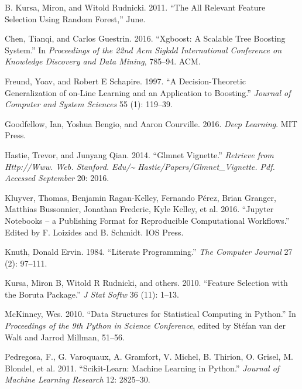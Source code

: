 \documentclass[
  11pt,
  a4paper,
  DIV=12,captions=tableheading,oneside]{scrbook}
\begin{document}
\leavevmode\hypertarget{ref-kursa2011boruta}{}%
B. Kursa, Miron, and Witold Rudnicki. 2011. ``The All Relevant Feature Selection Using Random Forest,'' June.

\leavevmode\hypertarget{ref-chen2016xgboost}{}%
Chen, Tianqi, and Carlos Guestrin. 2016. ``Xgboost: A Scalable Tree Boosting System.'' In \emph{Proceedings of the 22nd Acm Sigkdd International Conference on Knowledge Discovery and Data Mining}, 785--94. ACM.

\leavevmode\hypertarget{ref-freund1997decision}{}%
Freund, Yoav, and Robert E Schapire. 1997. ``A Decision-Theoretic Generalization of on-Line Learning and an Application to Boosting.'' \emph{Journal of Computer and System Sciences} 55 (1): 119--39.

\leavevmode\hypertarget{ref-Goodfellow-et-al-2016}{}%
Goodfellow, Ian, Yoshua Bengio, and Aaron Courville. 2016. \emph{Deep Learning}. MIT Press.

\leavevmode\hypertarget{ref-hastie2014glmnet}{}%
Hastie, Trevor, and Junyang Qian. 2014. ``Glmnet Vignette.'' \emph{Retrieve from Http://Www. Web. Stanford. Edu/\textasciitilde{} Hastie/Papers/Glmnet\_Vignette. Pdf. Accessed September} 20: 2016.

\leavevmode\hypertarget{ref-Kluyver:2016aa}{}%
Kluyver, Thomas, Benjamin Ragan-Kelley, Fernando Pérez, Brian Granger, Matthias Bussonnier, Jonathan Frederic, Kyle Kelley, et al. 2016. ``Jupyter Notebooks -- a Publishing Format for Reproducible Computational Workflows.'' Edited by F. Loizides and B. Schmidt. IOS Press.

\leavevmode\hypertarget{ref-knuth1984literate}{}%
Knuth, Donald Ervin. 1984. ``Literate Programming.'' \emph{The Computer Journal} 27 (2): 97--111.

\leavevmode\hypertarget{ref-kursa2010boruta}{}%
Kursa, Miron B, Witold R Rudnicki, and others. 2010. ``Feature Selection with the Boruta Package.'' \emph{J Stat Softw} 36 (11): 1--13.

\leavevmode\hypertarget{ref-mckinney-proc-scipy-2010}{}%
McKinney, Wes. 2010. ``Data Structures for Statistical Computing in Python.'' In \emph{Proceedings of the 9th Python in Science Conference}, edited by Stéfan van der Walt and Jarrod Millman, 51--56.

\leavevmode\hypertarget{ref-scikit-learn}{}%
Pedregosa, F., G. Varoquaux, A. Gramfort, V. Michel, B. Thirion, O. Grisel, M. Blondel, et al. 2011. ``Scikit-Learn: Machine Learning in Python.'' \emph{Journal of Machine Learning Research} 12: 2825--30.
\end{document}
